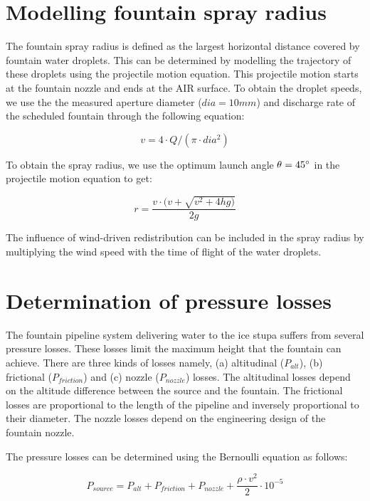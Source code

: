 \documentclass[tc, manuscript]{copernicus}
\begin{document}
\section{Modelling fountain spray radius} \label{sec:r_F}

The fountain spray radius is defined as the largest horizontal distance covered by fountain water droplets. This
can be determined by modelling the trajectory of these droplets using the projectile motion equation. This
projectile motion starts at the fountain nozzle and ends at the AIR surface.  To obtain the droplet speeds, we
use the the measured aperture diameter ($dia = 10 mm$) and discharge rate of the scheduled fountain  through the
following equation:

\begin{equation}
	\label{eqn:dis}
 v = 4 \cdot Q/(\pi \cdot dia^2)
\end{equation}

To obtain the spray radius, we use the optimum launch angle $\theta = 45 ^{\circ}$ in the projectile motion
equation to get:

\begin{equation}
  \label{eqn:radf}
  r = \frac{v \cdot(v + \sqrt{v^2 + 4hg)}}{2g}
\end{equation}

The influence of wind-driven redistribution can be included in the spray radius by multiplying the wind speed
with the time of flight of the water droplets.

\section{Determination of pressure losses} \label{sec:p_loss}

The fountain pipeline system delivering water to the ice stupa suffers from several pressure losses. These
losses limit the maximum height that the fountain can achieve. There are three kinds of losses namely, (a)
altitudinal ($P_{alt}$), (b) frictional ($P_{friction}$) and (c) nozzle ($P_{nozzle}$) losses. The altitudinal
losses depend on the altitude difference between the source and the fountain. The frictional losses are
proportional to the length of the pipeline and inversely proportional to their diameter. The nozzle losses
depend on the engineering design of the fountain nozzle.

The pressure losses can be determined using the Bernoulli equation as follows:

\begin{equation}
  \label{eqn:pressure}
  P_{source} = P_{alt} + P_{friction} + P_{nozzle} + \frac{\rho \cdot v^2}{2} \cdot 10 ^{-5}
\end{equation}
\end{document}

